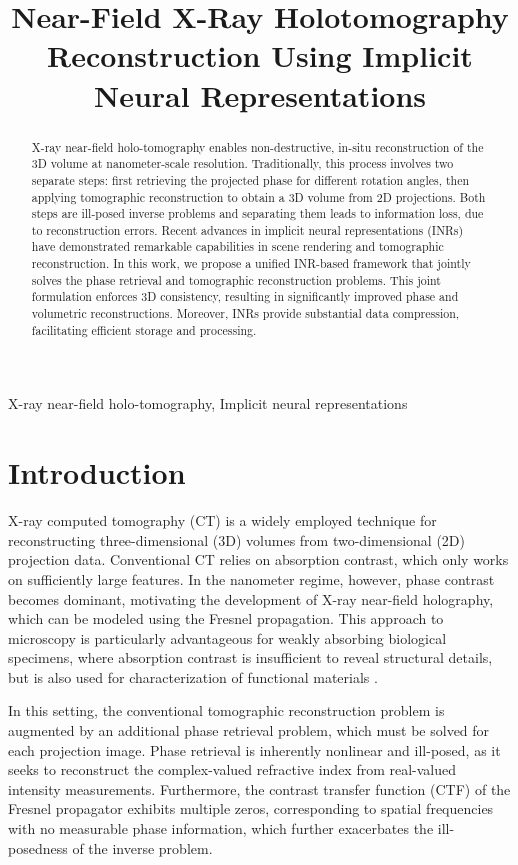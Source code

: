 \documentclass{article}
\title{Near-Field X-Ray Holotomography Reconstruction Using Implicit Neural Representations}
\begin{document}
%
\maketitle
%
\begin{abstract}
X-ray near-field holo-tomography enables non-destructive, in-situ reconstruction of the 3D volume at nanometer-scale resolution.
Traditionally, this process involves two separate steps: first retrieving the projected phase for different rotation angles, then applying tomographic reconstruction to obtain a 3D volume from 2D projections.
Both steps are ill-posed inverse problems and separating them leads to information loss, due to reconstruction errors.
Recent advances in implicit neural representations (INRs) have demonstrated remarkable capabilities in scene rendering and tomographic reconstruction.
In this work, we propose a unified INR-based framework that jointly solves the phase retrieval and tomographic reconstruction problems.
This joint formulation enforces 3D consistency, resulting in significantly improved phase and volumetric reconstructions.
Moreover, INRs provide substantial data compression, facilitating efficient storage and processing.
\end{abstract}
%
\begin{keywords}
X-ray near-field holo-tomography, Implicit neural representations
\end{keywords}
%
\section{Introduction}
\label{sec:intro}
X-ray computed tomography (CT) is a widely employed technique for reconstructing three-dimensional (3D) volumes from two-dimensional (2D) projection data.
Conventional CT relies on absorption contrast, which only works on sufficiently large features. 
In the nanometer regime, however, phase contrast becomes dominant, motivating the development of X-ray near-field holography, which can be modeled using the Fresnel propagation.
This approach to microscopy is particularly advantageous for weakly absorbing biological specimens, where absorption contrast is insufficient to reveal structural details, but is also used for characterization of functional materials \cite{vesely3DXrayNanotomography2021a,flennerHardXrayNanoholotomography2020b,gerhardtThreedimensionalArchitectureLinearized2025,reimersDevelopmentBioreactorCoupledFlowCell2023}.

In this setting, the conventional tomographic reconstruction problem is augmented by an additional phase retrieval problem, which must be solved for each projection image.
Phase retrieval is inherently nonlinear and ill-posed, as it seeks to reconstruct the complex-valued refractive index from real-valued intensity measurements.
Furthermore, the contrast transfer function (CTF) of the Fresnel propagator exhibits multiple zeros, corresponding to spatial frequencies with no measurable phase information, which further exacerbates the ill-posedness of the inverse problem.
\end{document}
